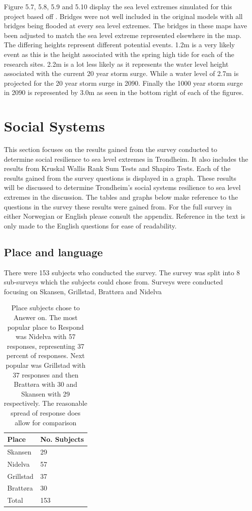 Figure 5.7, 5.8, 5.9 and 5.10 display the sea level extremes simulated for this project based off \cite{kartverket_se_2020}. Bridges were not well included in the original models with all bridges being flooded at every sea level extremes. The bridges in these maps have been adjusted to match the sea level extreme represented elsewhere in the map. The differing heights represent different potential events. 1.2m is a very likely event as this is the height associated with the spring high tide for each of the research sites. 2.2m is a lot less likely as it represents the water level height associated with the current 20 year storm surge. While a water level of 2.7m is projected for the 20 year storm surge in 2090. Finally the 1000 year storm surge in 2090 is represented by 3.0m as seen in the bottom right of each of the figures. 

\section{Social Systems}

This section focuses on the results gained from the survey conducted to determine social resilience to sea level extremes in Trondheim.  It also includes the results from Kruskal Wallis Rank Sum Tests and Shapiro Tests. Each of the results gained from the survey questions is displayed in a graph. These results will be discussed to determine Trondheim's social systems resilience to sea level extremes in the discussion. The tables and graphs below make reference to  the questions in the survey these results were gained from. For the full survey in either Norwegian or English please consult the appendix. Reference in the text is only made to the English questions for ease of readability. 



\subsection{Place and language}
There were 153 subjects who conducted the survey. The survey was split into 8 sub-surveys which the subjects could chose from. Surveys were conducted focusing on Skansen, Grillstad, Brattøra and Nidelva
\begin{table}[h!]
    \centering
    \begin{tabular}{|l|l|}
    \hline
    Place  & No. Subjects  \\ \hline
      Skansen   & 29    \\ \hline
      Nidelva & 57      \\ \hline
      Grillstad & 37       \\ \hline
      Brattøra & 30     \\ \hline
      Total & 153   \\ \hline
     \end{tabular}
    \caption{Place subjects chose to Answer on. The most popular place to Respond was Nidelva with 57 responses, representing 37 percent of responses. Next popular was Grillstad with 37 responses and then Brattøra with 30 and Skansen with 29 respectively. The reasonable spread of response does allow for comparison}
    \label{tab:place}
\end{table}
